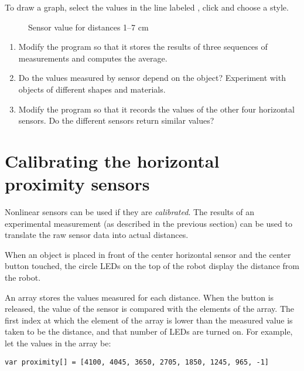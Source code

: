 To draw a graph, select the values in the line labeled
, click  and choose a style.

\begin{figure}
\caption{Sensor value for distances 1--7 cm}\label{fig.nonlinear}
\end{figure}


\begin{enumerate}
\item Modify the program so that it stores the results of three
sequences of measurements and computes the average.

\item Do the values measured by sensor depend on the object?
Experiment with objects of different shapes and materials.

\item Modify the program so that it records the values of the other four
horizontal sensors. Do the different sensors return similar values?
 
\end{enumerate}

\section{Calibrating the horizontal proximity sensors}

Nonlinear sensors can be used if they are \emph{calibrated}.
The results of an experimental measurement (as described in the previous
section) can be used to translate the raw sensor data into actual
distances.


When an object is placed in front of the center horizontal sensor and
the center button touched, the circle LEDs on the top of the robot
display the distance from the robot.


An array stores the values measured for each distance. When the button
is released, the value of the sensor is compared with the elements of
the array. The first index at which the element of the array is lower
than the measured value is taken to be the distance, and that number of
LEDs are turned on. For example, let the values in the array be:

\begin{verbatim}
var proximity[] = [4100, 4045, 3650, 2705, 1850, 1245, 965, -1]
\end{verbatim} 

